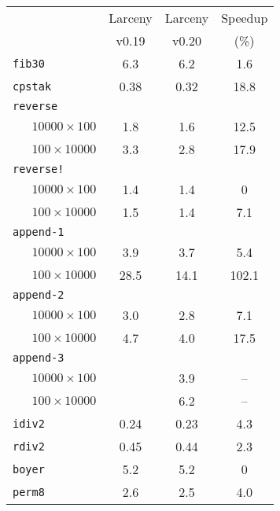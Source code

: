 \newcommand{\xx}{\verb+   +}  %

\begin{figure}[h]
\begin{center}
\begin{tabular}{|l|c|c|c|}
\hline
                            & Larceny  & Larceny   & Speedup    \\
                            &  v0.19   & v0.20     &   (\%)      \\
\hline\hline
{\tt fib30}                 &   6.3    &    6.2    &   1.6       \\
{\tt cpstak}                &   0.38   &    0.32   &  18.8       \\
{\tt reverse}               &&&\\
\xx     $10000 \times 100$  &   1.8    &    1.6    &  12.5       \\
\xx     $100 \times 10000$  &   3.3    &    2.8    &  17.9       \\
{\tt reverse!}              &&&\\
\xx     $10000 \times 100$  &   1.4    &    1.4    &   0          \\
\xx     $100 \times 10000$  &   1.5    &    1.4    &   7.1        \\
{\tt append-1}              &&&\\
\xx     $10000 \times 100$  &   3.9    &    3.7    &   5.4       \\
\xx     $100 \times 10000$  &  28.5    &    14.1   & 102.1       \\
{\tt append-2}              &&&\\
\xx     $10000 \times 100$  &   3.0    &    2.8    &   7.1       \\
\xx     $100 \times 10000$  &   4.7    &    4.0    &   17.5      \\
{\tt append-3}              &&&\\
\xx     $10000 \times 100$  &          &    3.9    &   --        \\
\xx     $100 \times 10000$  &          &    6.2    &   --        \\
{\tt idiv2}                 &   0.24   &    0.23   &   4.3       \\
{\tt rdiv2}                 &   0.45   &    0.44   &   2.3       \\
{\tt boyer}                 &   5.2    &    5.2    &   0         \\
{\tt perm8}                 &   2.6    &    2.5    &   4.0       \\

\end{tabular}
\end{center}
\end{figure}
